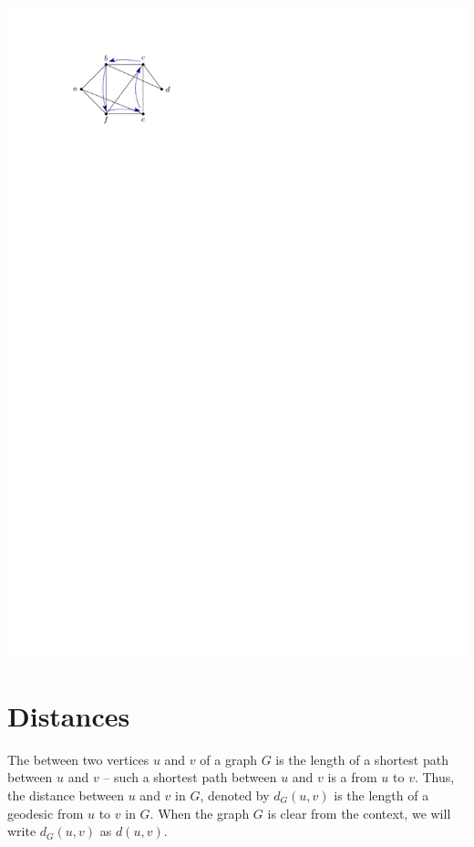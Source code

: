 \begin{Example}
\begin{center}
\includegraphics{Images/Cycle1.pdf}
\end{center}
\end{Example}

\section{Distances}\label{sec:Distances}

The  between two vertices $u$ and $v$ of a graph $G$ is the length of a shortest path between $u$ and $v$ -- such a shortest path between $u$ and $v$ is a  from $u$ to $v$. Thus, the distance between $u$ and $v$ in $G$, denoted by $d_G(u, v)$ is the length of a geodesic from $u$ to $v$ in $G$. When the graph $G$ is clear from the context, we will write $d_G(u, v)$ as $d(u, v)$.

